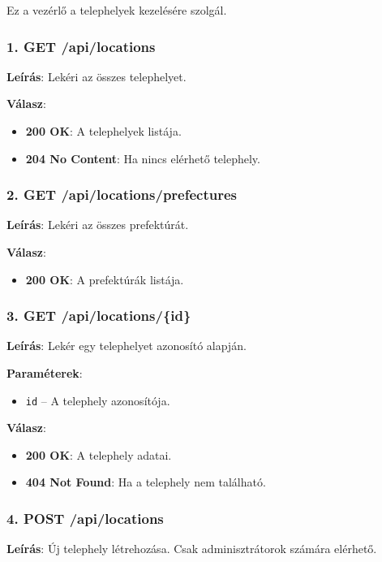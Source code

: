 \documentclass{report}[11pt]
\begin{document}
Ez a vezérlő a telephelyek kezelésére szolgál.

\subsubsection{1. GET /api/locations}

\textbf{Leírás}:  
Lekéri az összes telephelyet.

\textbf{Válasz}:  
\begin{itemize}
    \item \textbf{200 OK}: A telephelyek listája.
    \item \textbf{204 No Content}: Ha nincs elérhető telephely.
\end{itemize}

\subsubsection{2. GET /api/locations/prefectures}

\textbf{Leírás}:  
Lekéri az összes prefektúrát.

\textbf{Válasz}:  
\begin{itemize}
    \item \textbf{200 OK}: A prefektúrák listája.
\end{itemize}

\subsubsection{3. GET /api/locations/\{id\}}

\textbf{Leírás}:  
Lekér egy telephelyet azonosító alapján.

\textbf{Paraméterek}:  
\begin{itemize}
    \item \texttt{id} – A telephely azonosítója.
\end{itemize}

\textbf{Válasz}:  
\begin{itemize}
    \item \textbf{200 OK}: A telephely adatai.
    \item \textbf{404 Not Found}: Ha a telephely nem található.
\end{itemize}

\subsubsection{4. POST /api/locations}

\textbf{Leírás}:  
Új telephely létrehozása. Csak adminisztrátorok számára elérhető.
\end{document}
